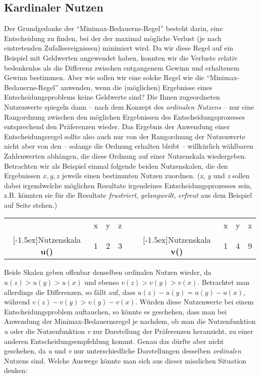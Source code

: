 \subsection{Kardinaler Nutzen}
\label{KardinalerNutzen}
Der Grundgedanke der "`Minimax-Bedauerns-Regel"' besteht darin, eine Entscheidung
zu finden, bei der der maximal mögliche Verlust (je nach eintretenden
Zufallsereignissen) minimiert wird. Da wir diese Regel auf ein Beispiel mit
Geldwerten angewendet haben, konnten wir die Verluste relativ bedenkenlos als die
Differenz zwischen entgangenem Gewinn und erhaltenem Gewinn bestimmen. Aber wie
sollen wir eine solche Regel wie die "`Minimax-Bedauerns-Regel"' anwenden, wenn
die (möglichen) Ergebnisse eines Entscheidungsproblems keine Geldwerte sind? Die
Ihnen zugeordneten Nutzenwerte spiegeln dann -- nach dem Konzept des {\em
ordinalen Nutzens} -- nur eine Rangordnung zwischen den möglichen Ergebnissen des
Entscheidungsprozesses entsprechend den Präferenzen wieder. Das Ergebnis der Anwendung einer Entscheidungsregel sollte
also auch nur von der Rangordnung der Nutzenwerte nicht aber von den -- solange
die Ordnung erhalten bleibt -- willkürlich wählbaren Zahlenwerten abhängen, die
diese Ordnung auf einer Nutzenskala wiedergeben. Betrachten wir als Beispiel
einmal folgende beiden Nutzenskalen, die den Ergebnissen $x, y, z$ jeweils einen
bestimmten Nutzen zuordnen. ({\em x}, {\em y} und {\em z} sollen dabei
irgendwelche möglichen Resultate irgendeines Entscheidungsprozesses sein, z.B.
könnten sie für die Resultate {\em frustriert}, {\em gelangweilt}, {\em erfreut}
aus dem Beispiel auf Seite \pageref{AngelnBeispiel} stehen.)

\begin{center}
\begin{tabular}{cc|c|cccc|c|c}
& x  &  y  &  z  &  &  &  x  &  y  &  z  \\ \cline{2-4} \cline{7-9}
\raisebox{1.5ex}[-1.5ex]{Nutzenskala {\bf u()}} 
& 1  &  2  &  3  &  &  
\raisebox{1.5ex}[-1.5ex]{Nutzenskala {\bf v()}}
&  1  &  4  &  9 
\end{tabular}
\end{center}

Beide Skalen geben offenbar denselben ordinalen Nutzen wieder, da $u(z) > u(y) >
u(x)$ und ebenso $v(z) > v(y) > v(x)$. Betrachtet man allerdings die Differenzen, so
fällt auf, dass $u(z) - u(y) = u(y) - u(x)$, während $v(z) - v(y) > v(y) -
v(x)$. Würden diese Nutzenwerte bei einem Entscheidungsproblem auftauchen, so
könnte es geschehen, dass man bei Anwendung der Minimax-Bedauernsregel je
nachdem, ob man die Nutzenfunktion {\em u} oder die Nutzenfunktion {\em v} zur
Darstellung der Präferenzen heranzieht, zu einer anderen
Entscheidungsempfehlung kommt. Genau das dürfte aber nicht geschehen, da {\em
u} und {\em v} nur unterschiedliche Darstellungen desselben {\em ordinalen}
Nutzens sind. Welche Auswege könnte man sich aus dieser misslichen Situation
denken:

